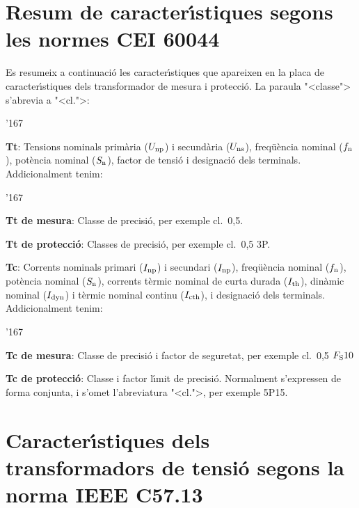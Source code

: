 \section{Resum de caracter\'{\i}stiques segons les normes \textsf{CEI 60044}}

Es resumeix a continuaci\'{o} les caracter\'{\i}stiques que apareixen en la placa de caracter\'{\i}stiques dels transformador de mesura i protecci\'{o}. La paraula
{"<}classe{">} s'abrevia a {"<}cl.{">}:

\begin{dinglist}{'167}
   \item \textbf{Tt}: Tensions nominals  prim\`{a}ria ($U_\mathrm{np}$) i secund\`{a}ria ($U_\mathrm{ns}$), freq\"{u}\`{e}ncia nominal ($f_\mathrm{n}$),
    pot\`{e}ncia nominal ($S_\mathrm{n}$), factor de tensi\'{o} i     designaci\'{o} dels terminals. Addicionalment tenim:
       \begin{dinglist}{'167}
           \item \textbf{Tt de mesura}: Classe de precisi\'{o}, per  exemple cl.~0,5.
           \item \textbf{Tt de protecci\'{o}}: Classes de precisi\'{o}, per  exemple cl.~0,5 3P.
        \end{dinglist}
    \item \textbf{Tc}: Corrents nominals primari ($I_\mathrm{np}$) i secundari ($I_\mathrm{np}$), freq\"{u}\`{e}ncia nominal ($f_\mathrm{n}$),
     pot\`{e}ncia nominal ($S_\mathrm{n}$),  corrents t\`{e}rmic nominal de curta durada ($I_\mathrm{th}$), din\`{a}mic nominal ($I_\mathrm{dyn}$) i t\`{e}rmic nominal continu ($I_\mathrm{cth}$), i     designaci\'{o} dels terminals. Addicionalment tenim:
        \begin{dinglist}{'167}
           \item \textbf{Tc de mesura}: Classe de precisi\'{o} i factor de seguretat, per exemple cl.~0,5 $F_\mathrm{S} 10$
           \item \textbf{Tc de protecci\'{o}}: Classe i factor l\'{\i}mit de precisi\'{o}. Normalment s'expressen de forma conjunta, i s'omet l'abreviatura {"<}cl.{">},  per exemple 5P15.
        \end{dinglist}
\end{dinglist}

\pagebreak
\section{Caracter\'{\i}stiques dels transformadors de tensi\'{o} segons la norma \textsf{IEEE C57.13}}

